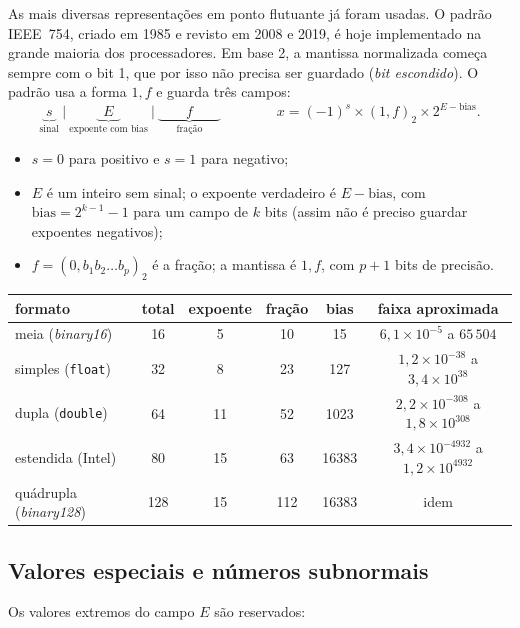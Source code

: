 As mais diversas representações em ponto flutuante já foram usadas. O padrão IEEE~754, criado em 1985
e revisto em 2008 e 2019, é hoje implementado na grande maioria dos processadores. Em base 2, a
mantissa normalizada começa sempre com o bit 1, que por isso não precisa ser guardado (\emph{bit
escondido}). O padrão usa a forma $1{,}f$ e guarda três campos:
\[
\underbrace{\ s\ }_{\text{sinal}}\ \Big|\ \underbrace{\ \ E\ \ }_{\text{expoente com bias}}\ \Big|\ \underbrace{\qquad f\qquad}_{\text{fração}}
\qquad\qquad
x=(-1)^s\times(1{,}f)_2\times2^{E-\text{bias}} .
\]

\begin{itemize}[nosep]
  \item $s=0$ para positivo e $s=1$ para negativo;
  \item $E$ é um inteiro sem sinal; o expoente verdadeiro é $E-\text{bias}$, com
        $\text{bias}=2^{k-1}-1$ para um campo de $k$ bits (assim não é preciso guardar expoentes negativos);
  \item $f=(0{,}b_1b_2\dots b_p)_2$ é a fração; a mantissa é $1{,}f$, com $p+1$ bits de precisão.
\end{itemize}

\begin{center}
\begin{tabular}{lccccc}
\toprule
formato & total & expoente & fração & bias & faixa aproximada\\
\midrule
meia (\emph{binary16})            & 16  & 5  & 10  & 15    & $6{,}1\times10^{-5}$ a $65\,504$\\
simples (\texttt{float})          & 32  & 8  & 23  & 127   & $1{,}2\times10^{-38}$ a $3{,}4\times10^{38}$\\
dupla (\texttt{double})           & 64  & 11 & 52  & 1023  & $2{,}2\times10^{-308}$ a $1{,}8\times10^{308}$\\
estendida (Intel)                 & 80  & 15 & 63  & 16383 & $3{,}4\times10^{-4932}$ a $1{,}2\times10^{4932}$\\
quádrupla (\emph{binary128})      & 128 & 15 & 112 & 16383 & idem\\
\bottomrule
\end{tabular}
\end{center}

\subsection{Valores especiais e números subnormais}

Os valores extremos do campo $E$ são reservados:

